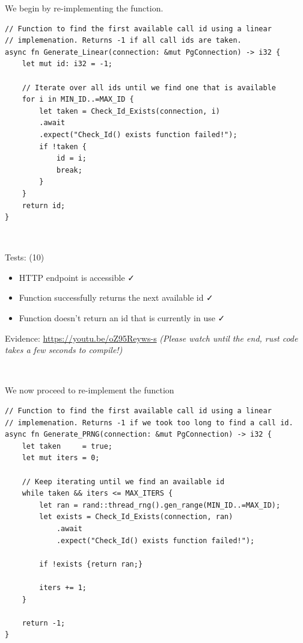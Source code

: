 We begin by re-implementing the 
function.

\begin{verbatim}
// Function to find the first available call id using a linear
// implemenation. Returns -1 if all call ids are taken.
async fn Generate_Linear(connection: &mut PgConnection) -> i32 {
    let mut id: i32 = -1;

    // Iterate over all ids until we find one that is available
    for i in MIN_ID..=MAX_ID {
        let taken = Check_Id_Exists(connection, i)
	    .await
	    .expect("Check_Id() exists function failed!");
        if !taken {
            id = i;
            break;
        }
    }
    return id;
}
\end{verbatim}

{\color{gray} \hrulefill} \\ \vspace{0.2cm}

{\sffamily Tests: (10)}

\begin{itemize}
\item HTTP endpoint is accessible \faCheck \\
\item Function successfully returns the next available id \faCheck \\
\item Function doesn't return an id that is currently in use \faCheck \\
\end{itemize}

{\sffamily Evidence:} \url{https://youtu.be/oZ95Reyws-s}
\textit{(Please watch until the end, rust code takes a
few seconds to compile!)}

{\color{gray} \hrulefill} \\ \vspace{0.2cm}

We now proceed to re-implement the  function

\begin{verbatim}
// Function to find the first available call id using a linear
// implemenation. Returns -1 if we took too long to find a call id.
async fn Generate_PRNG(connection: &mut PgConnection) -> i32 {
    let taken     = true;
    let mut iters = 0;

    // Keep iterating until we find an available id
    while taken && iters <= MAX_ITERS {
        let ran = rand::thread_rng().gen_range(MIN_ID..=MAX_ID);
        let exists = Check_Id_Exists(connection, ran)
            .await
            .expect("Check_Id() exists function failed!");

        if !exists {return ran;}

        iters += 1;
    }

    return -1;
}
\end{verbatim}


